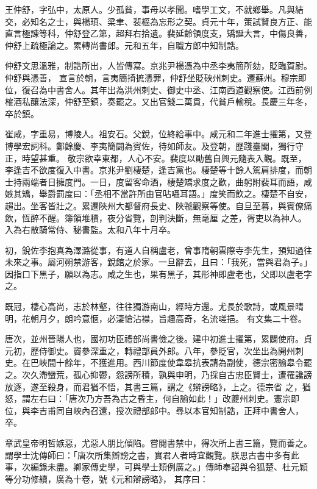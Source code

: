 \begin{pinyinscope}
 王仲舒，字弘中，太原人。少孤貧，事母以孝聞。嗜學工文，不就鄉舉。凡與結交，必知名之士，與楊頊、梁聿、裴樞為忘形之契。貞元十年，策試賢良方正、能直言極諫等科，仲舒登乙第，超拜右拾遺。裴延齡領度支，矯誕大言，中傷良善，仲舒上疏極論之。累轉尚書郎。元和五年，自職方郎中知制誥。



 仲舒文思溫雅，制誥所出，人皆傳寫。京兆尹楊憑為中丞李夷簡所劾，貶臨賀尉。仲舒與憑善，
 宣言於朝，言夷簡掎摭憑罪，仲舒坐貶硤州刺史。遷蘇州。穆宗即位，復召為中書舍人。其年出為洪州刺史、御史中丞、江南西道觀察使。江西前例榷酒私釀法深，仲舒至鎮，奏罷之。又出官錢二萬貫，代貧戶輸稅。長慶三年冬，卒於鎮。



 崔咸，字重易，博陵人。祖安石。父銳，位終給事中。咸元和二年進士擢第，又登博學宏詞科。鄭餘慶、李夷簡闢為賓佐，待如師友。及登朝，歷踐臺閣，獨行守正，時望甚重。
 敬宗欲幸東都，人心不安。裴度以勛舊自興元隨表入覲。既至，李逢吉不欲度復入中書。京兆尹劉棲楚，逢吉黨也。棲楚等十餘人駕肩排度，而朝士持兩端者日擁度門。一日，度留客命酒，棲楚矯求度之歡，曲躬附裴耳而語，咸嫉其矯，舉爵罰度曰：「丞相不當許所由官呫囁耳語。」度笑而飲之。棲楚不自安，趨出。坐客皆壯之。累遷陜州大都督府長史、陜虢觀察等使。自旦至暮，與賓僚痛飲，恆醉不醒。簿領堆積，夜分省覽，剖判決斷，無毫厘
 之差，胥吏以為神人。入為右散騎常侍、秘書監。太和八年十月卒。



 初，銳佐李抱真為澤潞從事，有道人自稱盧老，曾事隋朝雲際寺李先生，預知過往未來之事。屬河朔禁游客，銳館之於家。一旦辭去，且曰：「我死，當與君為子。」因指口下黑子，願以為志。咸之生也，果有黑子，其形神即盧老也，父即以盧老字之。



 既冠，棲心高尚，志於林壑，往往獨游南山，經時方還。尤長於歌詩，或風景晴明，花朝月夕，朗吟意愜，必淒愴沾襟，旨趣高奇，名流嗟挹。
 有文集二十卷。



 唐次，並州晉陽人也，國初功臣禮部尚書儉之後。建中初進士擢第，累闢使府。貞元初，歷侍御史。竇參深重之，轉禮部員外郎。八年，參貶官，次坐出為開州刺史。在巴峽間十餘年，不獲進用。西川節度使韋皋抗表請為副使，德宗密諭皋令罷之。次久滯蠻荒，孤心抑鬱，怨謗所積，孰與申明，乃採自古忠臣賢士，遭罹讒謗放逐，遂至殺身，而君猶不悟，其書三篇，謂之《辯謗略》，上之。德宗省
 之，猶怒，謂左右曰：「唐次乃方吾為古之昏主，何自諭如此！」改夔州刺史。憲宗即位，與李吉甫同自峽內召還，授次禮部郎中。尋以本官知制誥，正拜中書舍人，卒。



 章武皇帝明哲嫉惡，尤惡人朋比傾陷。嘗閱書禁中，得次所上書三篇，覽而善之。謂學士沈傳師曰：「唐次所集辯謗之書，實君人者時宜觀覽。朕思古書中多有此事，次編錄未盡。卿家傳史學，可與學士類例廣之。」傳師奉詔與令狐楚、杜元穎等分功修續，廣為十卷，號《元和辯謗略》，
 其序曰：




\end{pinyinscope}
